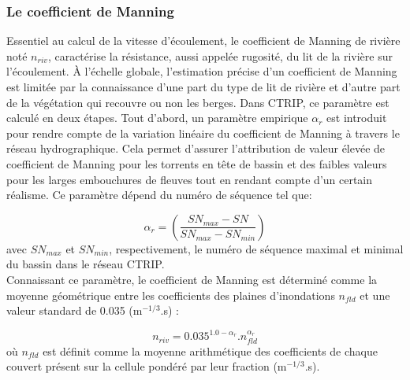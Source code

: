 \subsubsection{\selectfont Le coefficient de Manning}
Essentiel au calcul de la vitesse d'écoulement, le coefficient de Manning de rivière noté $n_{riv}$, caractérise la résistance, aussi appelée rugosité, du lit de la rivière sur l'écoulement. À l'échelle globale, l'estimation précise d'un coefficient de Manning est limitée par la connaissance d'une part du type de lit de rivière et d'autre part de la végétation qui recouvre ou non les berges.
Dans CTRIP, ce paramètre est calculé en deux étapes. Tout d'abord, un paramètre empirique $\alpha_{r}$ est introduit pour rendre compte de la variation linéaire du coefficient de Manning à travers le réseau hydrographique. Cela permet d'assurer l'attribution de valeur élevée de coefficient de Manning pour les torrents en tête de bassin et des faibles valeurs pour les larges embouchures de fleuves tout en rendant compte d'un certain réalisme. Ce paramètre dépend du numéro de séquence tel que:

\begin{equation}
\alpha_{r} = \left(\frac{SN_{max}-SN}{SN_{max}-SN_{min}}\right)
\end{equation}
avec $SN_{max}$ et $SN_{min}$, respectivement, le numéro de séquence maximal et minimal du bassin dans le réseau CTRIP.\\

\noindent Connaissant ce paramètre, le coefficient de Manning est déterminé comme la moyenne géométrique entre les coefficients des plaines d'inondations $n_{fld}$ et une valeur standard de 0.035 (m$^{-1/3}$.s) \citep{lucas2003, yamazaki2011}:

\begin{equation}
n_{riv} = 0.035^{1.0-\alpha_{r}}.n_{fld}^{\alpha_{r}}
\end{equation}
où $n_{fld}$ est définit comme la moyenne arithmétique des coefficients de chaque couvert présent sur la cellule pondéré par leur fraction (m$^{-1/3}$.s).

